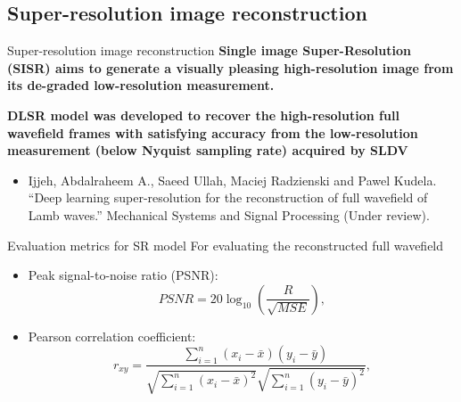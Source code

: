\documentclass[10pt,aspectratio=169]{beamer} %
\begin{document}
\subsection{Super-resolution image reconstruction}
\setcounter{subfigure}{0}
\begin{frame}{Super-resolution image reconstruction}
\textbf{Single image Super-Resolution (SISR) aims to generate a visually pleasing high-resolution image from its de-graded low-resolution measurement.}
\begin{figure}
	\centering
	\qquad
	\qquad
\end{figure}
\textbf{DLSR model was developed to recover the high-resolution full wavefield
	frames with satisfying accuracy from the low-resolution measurement (below Nyquist sampling rate) acquired by SLDV}
\tiny
\begin{itemize}
	\item Ijjeh, Abdalraheem A., Saeed Ullah, Maciej Radzienski and Pawel Kudela. “Deep learning super-resolution for the reconstruction of full wavefield of Lamb waves.”
	Mechanical Systems and Signal Processing (Under review).
\end{itemize}
\end{frame}

\begin{frame}{Evaluation metrics for SR model}
	For evaluating the reconstructed full wavefield
	\begin{itemize}
		\item Peak signal-to-noise ratio (PSNR):
		\begin{equation*}
			PSNR=20\log_{10}\left(\frac{R}{\sqrt{MSE}}\right),
			\label{PSNR}
		\end{equation*}
		\item Pearson correlation coefficient:
		\begin{equation*}
			r_{xy} = \frac{\sum_{i=1}^{n}(x_i - \bar{x})(y_i-\bar{y})}{\sqrt{\sum_{i=1}^{n}(x_i - \bar{x})^2}\sqrt{\sum_{i=1}^{n}(y_i - \bar{y})^2}},
			\label{Pearson}
		\end{equation*}
	\end{itemize}
\end{frame}
\end{document}
